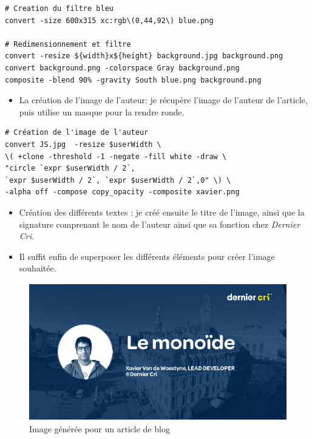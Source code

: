 \begin{verbatim}
# Creation du filtre bleu
convert -size 600x315 xc:rgb\(0,44,92\) blue.png

# Redimensionnement et filtre
convert -resize ${width}x${height} background.jpg background.png
convert background.png -colorspace Gray background.png
composite -blend 90% -gravity South blue.png background.png
\end{verbatim}

\begin{itemize}
\tightlist
\item
  La création de l'image de l'auteur: je récupère l'image de l'auteur de
  l'article, puis utilise un masque pour la rendre ronde.
\end{itemize}

\begin{verbatim}
# Création de l'image de l'auteur
convert JS.jpg  -resize $userWidth \
\( +clone -threshold -1 -negate -fill white -draw \
"circle `expr $userWidth / 2`,
`expr $userWidth / 2`, `expr $userWidth / 2`,0" \) \
-alpha off -compose copy_opacity -composite xavier.png
\end{verbatim}

\begin{itemize}
\item
  Création des différents textes : je créé ensuite le titre de l'image,
  ainsi que la signature comprenant le nom de l'auteur ainsi que sa
  fonction chez \emph{Dernier Cri}.
\item
  Il suffit enfin de superposer les différents éléments pour créer
  l'image souhaitée.
\end{itemize}

\begin{figure}[h]
  \centering
  \includegraphics[height=6cm]{figures/blog.png}
  \caption{Image générée pour un article de blog}
\end{figure}

\bigskip

